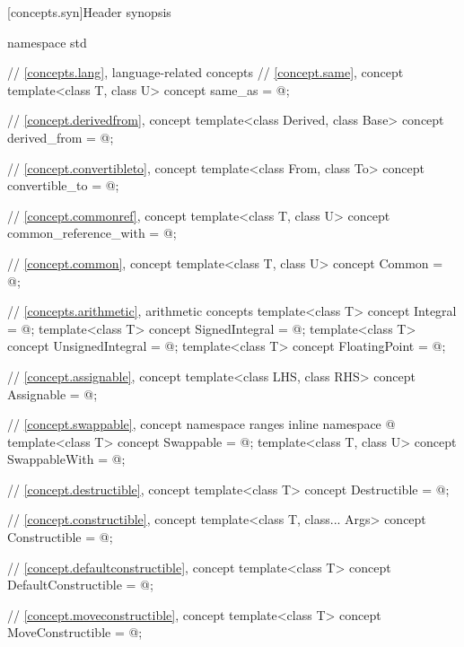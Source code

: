[concepts.syn]{Header  synopsis}

%
\begin{codeblock}
namespace std {
  // \ref{concepts.lang}, language-related concepts
  // \ref{concept.same}, concept 
  template<class T, class U>
    concept same_as = @\seebelow@;

  // \ref{concept.derivedfrom}, concept 
  template<class Derived, class Base>
    concept derived_from = @\seebelow@;

  // \ref{concept.convertibleto}, concept 
  template<class From, class To>
    concept convertible_to = @\seebelow@;

  // \ref{concept.commonref}, concept 
  template<class T, class U>
    concept common_reference_with = @\seebelow@;

  // \ref{concept.common}, concept 
  template<class T, class U>
    concept Common = @\seebelow@;

  // \ref{concepts.arithmetic}, arithmetic concepts
  template<class T>
    concept Integral = @\seebelow@;
  template<class T>
    concept SignedIntegral = @\seebelow@;
  template<class T>
    concept UnsignedIntegral = @\seebelow@;
  template<class T>
    concept FloatingPoint = @\seebelow@;

  // \ref{concept.assignable}, concept 
  template<class LHS, class RHS>
    concept Assignable = @\seebelow@;

  // \ref{concept.swappable}, concept 
  namespace ranges {
    inline namespace @
  }
  template<class T>
    concept Swappable = @\seebelow@;
  template<class T, class U>
    concept SwappableWith = @\seebelow@;

  // \ref{concept.destructible}, concept 
  template<class T>
    concept Destructible = @\seebelow@;

  // \ref{concept.constructible}, concept 
  template<class T, class... Args>
    concept Constructible = @\seebelow@;

  // \ref{concept.defaultconstructible}, concept 
  template<class T>
    concept DefaultConstructible = @\seebelow@;

  // \ref{concept.moveconstructible}, concept 
  template<class T>
    concept MoveConstructible = @\seebelow@;

}
\end{codeblock}
